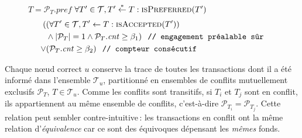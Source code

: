 \begin{figure}[t]
\begin{center}
\small
\begin{algorithmic}[1]
        \State \Return $T = \mathcal{P}_T\mathit{.pref}$
    \EndFunction
        \State \Return $\forall T'\in\mathcal{T}, T' \stackrel{*}{\gets} T: \Call{isPreferred}{T'}$
    \EndFunction
        \State\Return
            \vspace*{-.5\baselineskip}
        \begin{align*}
            (&(\forall T' \in \mathcal{T}, T' \gets T: \Call{isAccepted}{T'}) \\
                &\land |\mathcal{P}_T| = 1 \land \mathcal{P}_T\mathit{.cnt} \ge \beta_1) \texttt{\hspace{.1in}// engagement préalable sûr} \\
            \lor &(%
            \mathcal{P}_T\mathit{.cnt} \ge \beta_2)\texttt{\hspace{.1in}// compteur consécutif}
        \end{align*}
    \EndFunction
        \State {}
        \State {}
    \EndProcedure
    \label{fig:gossipchain-onquery}
\end{algorithmic}
\end{center}
\end{figure}

Chaque nœud correct $u$ conserve la trace de toutes les tran\-sactions dont il a été informé dans l'ensemble $\mathcal{T}_u$, partitionné en ensembles de conflits mutuellement exclusifs $\mathcal{P}_T$, $T \in \mathcal{T}_u$.
Comme les conflits sont transitifs, si $T_i$ et $T_j$ sont en conflit, ils appartiennent au même ensemble de conflits, c'est-à-dire $\mathcal{P}_{T_i} = \mathcal{P}_{T_j}$. Cette relation peut sembler contre-intuitive\,: les transactions en conflit ont la même relation d'\emph{équivalence} car ce sont des équivoques dépensant les \emph{mêmes} fonds.


